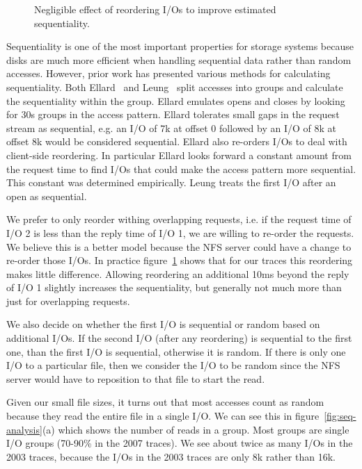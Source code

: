 \begin{figure}
\caption{Negligible effect of reordering I/Os to improve estimated sequentiality.}
\label{fig:seq-bytes-compare}
\end{figure}

Sequentiality is one of the most important properties for storage
systems because disks are much more efficient when handling sequential
data rather than random accesses.  However, prior work has presented
various methods for calculating sequentiality.  Both
Ellard~\cite{EllardFast03} and Leung~\cite{LeungUsenix08} split accesses
into groups and calculate the sequentiality within the group.  Ellard
emulates opens and closes by looking for 30s groups in the access
pattern.  Ellard tolerates small gaps in the request stream as
sequential, e.g. an I/O of 7k at offset 0 followed by an I/O of 8k at
offset 8k would be considered sequential.  Ellard also re-orders I/Os
to deal with client-side reordering. In particular Ellard looks
forward a constant amount from the request time to find I/Os that
could make the access pattern more sequential.  This constant was
determined empirically.  Leung treats the first I/O after an open as
sequential.

We prefer to only reorder withing overlapping requests, i.e. if the
request time of I/O 2 is less than the reply time of I/O 1, we are
willing to re-order the requests.  We believe this is a better model
because the NFS server could have a change to re-order those I/Os.  In
practice figure~\ref{fig:seq-bytes-compare} shows that for our traces
this reordering makes little difference.  Allowing reordering an
additional 10ms beyond the reply of I/O 1 slightly increases the
sequentiality, but generally not much more than just for overlapping
requests.

We also decide on whether the first I/O is sequential or random based
on additional I/Os.  If the second I/O (after any reordering) is
sequential to the first one, than the first I/O is sequential,
otherwise it is random.  If there is only one I/O to a particular
file, then we consider the I/O to be random since the NFS server would
have to reposition to that file to start the read.  

Given our small file sizes, it turns out that most accesses count as
random because they read the entire file in a single I/O.  We can see
this in figure~\ref{fig:seq-analysis}(a) which shows the number of
reads in a group.  Most groups are single I/O groups (70-90\% in the
2007 traces).  We see about twice as many I/Os in the 2003 traces,
because the I/Os in the 2003 traces are only 8k rather than 16k.

